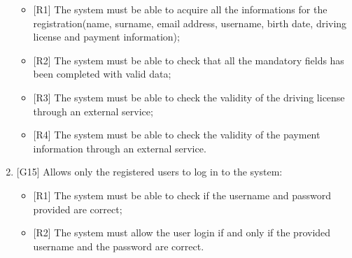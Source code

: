 \begin{enumerate}
\begin{itemize}
	\item {[R1]} The system must be able to acquire all the informations for the registration(name, surname, email address, username, birth date, driving license and payment information);
	\item {[R2]} The system must be able to check that all the mandatory fields has been completed with valid data;
	\item {[R3]} The system must be able to check the validity of the driving license through an external service;
	\item {[R4]} The system must be able to check the validity of the payment information through an external service.
\end{itemize}

\item {[G15]} Allows only the registered users to log in to the system:

\begin{itemize}
	\item {[R1]} The system must be able to check if the username and password provided are correct;
	\item {[R2]} The system must allow the user login if and only if the provided username and the password are correct.
\end{itemize}

\end{enumerate}